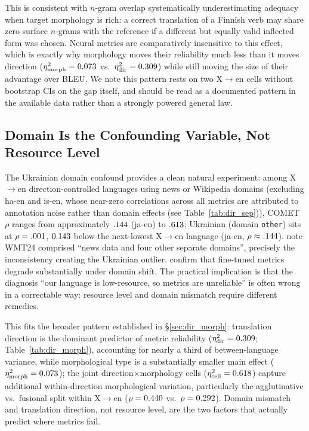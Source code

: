 \documentclass[11pt]{article}
\begin{document}
This is consistent with $n$-gram overlap systematically underestimating adequacy when target morphology is rich: a correct translation of a Finnish verb may share zero surface $n$-grams with the reference if a different but equally valid inflected form was chosen. Neural metrics are comparatively insensitive to this effect, which is exactly why morphology moves their reliability much less than it moves direction ($\eta^2_{\text{morph}}=0.073$ vs.\ $\eta^2_{\text{dir}}=0.309$) while still moving the size of their advantage over BLEU. We note this pattern rests on two X$\to$en cells without bootstrap CIs on the gap itself, and should be read as a documented pattern in the available data rather than a strongly powered general law.

\subsection{Domain Is the Confounding Variable, Not Resource Level}
\label{sec:domain_confound}

The Ukrainian domain confound provides a clean natural experiment: among X$\to$en direction-controlled languages using news or Wikipedia domains (excluding ha-en and is-en, whose near-zero correlations across all metrics are attributed to annotation noise rather than domain effects (see Table~\ref{tab:dir_sep})), COMET $\rho$ ranges from approximately $.144$ (ja-en) to $.613$; Ukrainian (domain \texttt{other}) sits at $\rho=.001$, $0.143$ below the next-lowest X$\to$en language (ja-en, $\rho\approx.144$). \citet{kocmi2024findings} note WMT24 comprised ``news data and four other separate domains'', precisely the inconsistency creating the Ukrainian outlier. \citet{zouhar2024domain} confirm that fine-tuned metrics degrade substantially under domain shift. The practical implication is that the diagnosis ``our language is low-resource, so metrics are unreliable'' is often wrong in a correctable way: resource level and domain mismatch require different remedies.

This fits the broader pattern established in \S\ref{sec:dir_morph}: translation direction is the dominant predictor of metric reliability ($\eta^2_{\text{dir}}=0.309$; Table~\ref{tab:dir_morph}), accounting for nearly a third of between-language variance, while morphological type is a substantially smaller main effect ($\eta^2_{\text{morph}}=0.073$); the joint direction$\times$morphology cells ($\eta^2_{\text{cell}}=0.618$) capture additional within-direction morphological variation, particularly the agglutinative vs.\ fusional split within X$\to$en ($\rho=0.440$ vs.\ $\rho=0.292$). Domain mismatch and translation direction, not resource level, are the two factors that actually predict where metrics fail.
\end{document}

